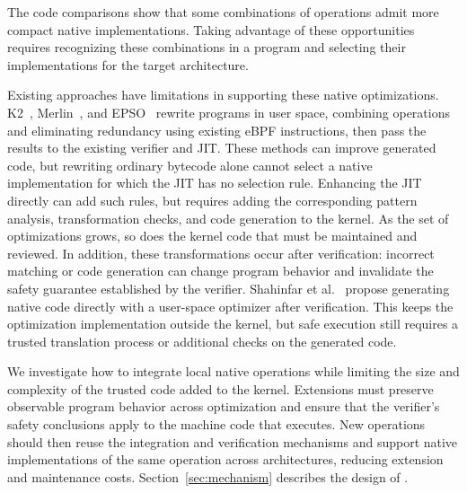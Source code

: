 The code comparisons show that some combinations of operations admit more compact native implementations. Taking advantage of these opportunities requires recognizing these combinations in a program and selecting their implementations for the target architecture.

Existing approaches have limitations in supporting these native optimizations. K2~\cite{xu2021synthesizing}, Merlin~\cite{mao2024merlin}, and EPSO~\cite{zhu2025epso} rewrite programs in user space, combining operations and eliminating redundancy using existing eBPF instructions, then pass the results to the existing verifier and JIT. These methods can improve generated code, but rewriting ordinary bytecode alone cannot select a native implementation for which the JIT has no selection rule. Enhancing the JIT directly can add such rules, but requires adding the corresponding pattern analysis, transformation checks, and code generation to the kernel. As the set of optimizations grows, so does the kernel code that must be maintained and reviewed. In addition, these transformations occur after verification: incorrect matching or code generation can change program behavior and invalidate the safety guarantee established by the verifier. Shahinfar et al.~\cite{shahinfar2026fun} propose generating native code directly with a user-space optimizer after verification. This keeps the optimization implementation outside the kernel, but safe execution still requires a trusted translation process or additional checks on the generated code.

We investigate how to integrate local native operations while limiting the size and complexity of the trusted code added to the kernel. Extensions must preserve observable program behavior across optimization and ensure that the verifier's safety conclusions apply to the machine code that executes. New operations should then reuse the integration and verification mechanisms and support native implementations of the same operation across architectures, reducing extension and maintenance costs. Section~\ref{sec:mechanism} describes the design of \tool.
